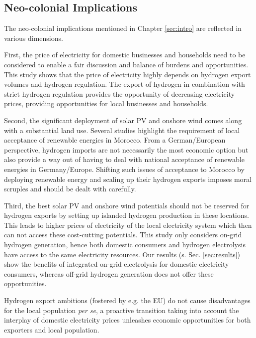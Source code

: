 \subsection{Neo-colonial Implications}
\label{subsec:neocolonial}
The neo-colonial implications mentioned in Chapter \ref{sec:intro} are reflected in various dimensions. 

First, the price of electricity for domestic businesses and households need to be considered to enable a fair discussion and balance of burdens and opportunities. This study shows that the price of electricity highly depends on hydrogen export volumes and hydrogen regulation. The export of hydrogen in combination with strict hydrogen regulation provides the opportunity of decreasing electricity prices, providing opportunities for local businesses and households.

Second, the significant deployment of solar PV and onshore wind comes along with a substantial land use. Several studies \cite{Terrapon-Pfaff2019, Hanger2016} highlight the requirement of local acceptance of renewable energies in Morocco. From a German/European perspective, hydrogen imports are not necessarily the most economic option but also provide a way out of having to deal with national acceptance of renewable energies in Germany/Europe. %
Shifting such issues of acceptance to Morocco by deploying renewable energy and scaling up their hydrogen exports imposes moral scruples and should be dealt with carefully. %


Third, the best solar PV and onshore wind potentials should not be reserved for hydrogen exports by setting up islanded hydrogen production in these locations. This leads to higher prices of electricity of the local electricity system which then can not access these cost-cutting potentials. This study only considers on-grid hydrogen generation, hence both domestic consumers and hydrogen electrolysis have access to the same electricity resources. Our results (s. Sec. \ref{sec:results}) show the benefits of integrated on-grid electrolysis for domestic electricity consumers, whereas off-grid hydrogen generation does not offer these opportunities.


Hydrogen export ambitions (fostered by e.g. the EU) do not cause disadvantages for the local population \textit{per se}, a proactive transition taking into account the interplay of domestic electricity prices unleashes economic opportunities for both exporters and local population.

